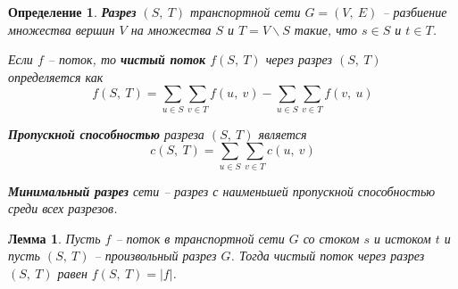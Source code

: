 \documentclass[a4paper,12pt]{article}
\newtheorem*{fulllemma}{Лемма}
\newtheorem*{definition}{Определение}
\begin{document}
\begin{definition}
    \textbf{Разрез} $(S,\ T)$ транспортной сети $G = (V,\ E)$ -- разбиение множества вершин $V$ на множества $S$ и $T = V \backslash S$ такие, что $s \in S$ и $t \in T$.
    
    Если $f$ -- поток, то \textbf{чистый поток} $f(S,\ T)$ через разрез $(S,\ T)$ определяется как\[f(S,\ T) = \sum\limits_{u \in S}\sum\limits_{v \in T}f(u,\ v) - \sum\limits_{u \in S}\sum\limits_{v \in T}f(v,\ u)\]
    
    \textbf{Пропускной способностью} разреза $(S,\ T)$ является \[c(S,\ T) = \sum\limits_{u \in S}\sum\limits_{v \in T}c(u,\ v)\]
    
    \textbf{Минимальный разрез} сети -- разрез с наименьшей пропускной способностью среди всех разрезов.
\end{definition}
\begin{fulllemma}
Пусть $f$ -- поток в транспортной сети $G$ со стоком $s$ и истоком $t$ и пусть $(S,\ T)$ -- произвольный разрез $G$. Тогда чистый поток через разрез $(S,\ T)$ равен $f(S,\ T) = |f|$.
\end{fulllemma}
\end{document}
